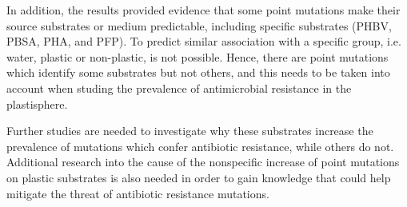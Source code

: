 In addition, the results provided evidence that some point mutations make their source substrates or medium predictable, including specific substrates (PHBV, PBSA, PHA, and PFP). To predict similar association with a specific group, i.e. water, plastic or non-plastic, is not possible.
Hence, there are point mutations which identify some substrates but not others, and this needs to be taken into account when studing the prevalence of antimicrobial resistance in the plastisphere.

Further studies are needed to investigate why these substrates increase the prevalence of mutations which confer antibiotic resistance, while others do not.
Additional research into the cause of the nonspecific increase of point mutations on plastic substrates is also needed in order to gain knowledge that could help mitigate the threat of antibiotic resistance mutations.
